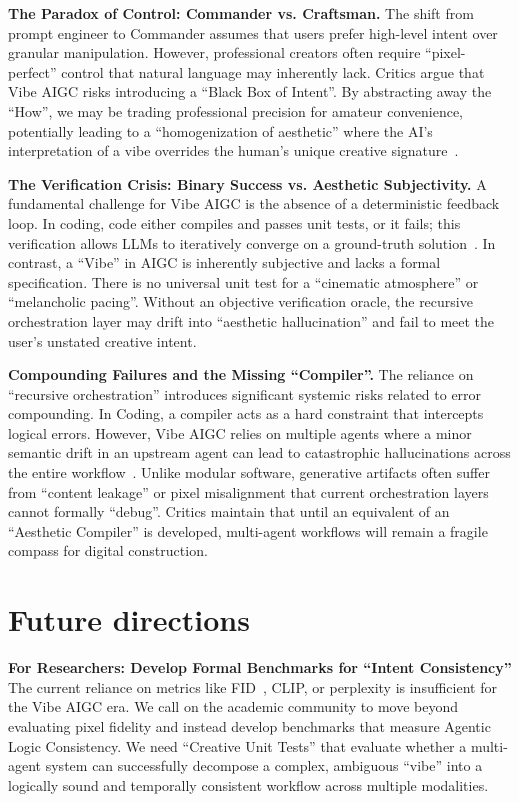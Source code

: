 \documentclass{article}
\begin{document}
\noindent\textbf{The Paradox of Control: Commander vs. Craftsman.}
The shift from prompt engineer to Commander assumes that users prefer high-level intent over granular manipulation. However, professional creators often require ``pixel-perfect'' control that natural language may inherently lack. Critics argue that Vibe AIGC risks introducing a ``Black Box of Intent''.
By abstracting away the ``How'', we may be trading professional precision for amateur convenience, potentially leading to a ``homogenization of aesthetic'' where the AI's interpretation of a vibe overrides the human's unique creative signature~\citep{flusser2013towards,benjamin2018work}.

\noindent\textbf{The Verification Crisis: Binary Success vs. Aesthetic Subjectivity.}
A fundamental challenge for Vibe AIGC is the absence of a deterministic feedback loop. 
In coding, code either compiles and passes unit tests, or it fails; this verification allows LLMs to iteratively converge on a ground-truth solution~\citep{xu2025swecompassunifiedevaluationagentic}. In contrast, a ``Vibe'' in AIGC is inherently subjective and lacks a formal specification. There is no universal unit test for a ``cinematic atmosphere'' or ``melancholic pacing''. 
Without an objective verification oracle, the recursive orchestration layer may drift into ``aesthetic hallucination'' and fail to meet the user’s unstated creative intent.

\noindent\textbf{Compounding Failures and the Missing ``Compiler''.} 
The reliance on ``recursive orchestration''  introduces significant systemic risks related to error compounding.
In Coding, a compiler acts as a hard constraint that intercepts logical errors. However, Vibe AIGC relies on multiple agents where a minor semantic drift in an upstream agent can lead to catastrophic hallucinations across the entire workflow~\citep{cemri2025multi}. Unlike modular software, generative artifacts often suffer from ``content leakage'' or pixel misalignment that current orchestration layers cannot formally ``debug''. Critics maintain that until an equivalent of an ``Aesthetic Compiler'' is developed, multi-agent workflows will remain a fragile compass for digital construction.

\section{Future directions}
\label{action}
\noindent\textbf{For Researchers: Develop Formal Benchmarks for ``Intent Consistency''}
The current reliance on metrics like FID~\citep{Jayasumana2023RethinkingFT}, CLIP, or perplexity is insufficient for the Vibe AIGC era. We call on the academic community to move beyond evaluating pixel fidelity and instead develop benchmarks that measure Agentic Logic Consistency. We need ``Creative Unit Tests'' that evaluate whether a multi-agent system can successfully decompose a complex, ambiguous ``vibe'' into a logically sound and temporally consistent workflow across multiple modalities.
\end{document}
